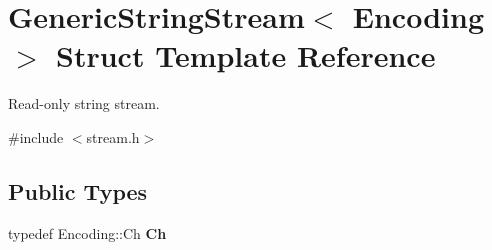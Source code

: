 \hypertarget{struct_generic_string_stream}{}\section{Generic\+String\+Stream$<$ Encoding $>$ Struct Template Reference}
\label{struct_generic_string_stream}


Read-\/only string stream.  




{\ttfamily \#include $<$stream.\+h$>$}

\subsection*{Public Types}
\begin{DoxyCompactItemize}
\item 
\mbox{\label{struct_generic_string_stream_a4289aca895330084ff3168e37e4f08bd}} 
typedef Encoding\+::\+Ch {\bfseries Ch}
\end{DoxyCompactItemize}
